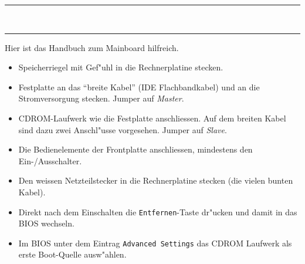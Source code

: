 \documentclass[11pt]{article}
\begin{document}
\hskip 12mm
\rule[-18.8cm]{0.2pt}{5mm}  %
\hskip 12mm
\begin{minipage}[t]{7cm}
\hfill {\Large{}}\\
\hrule
{}

Hier ist das Handbuch zum Mainboard hilfreich.

\begin{itemize}
\item Speicherriegel mit Gef"uhl in die Rechnerplatine stecken.

\item Festplatte an das "`breite Kabel"' (IDE Flachbandkabel) und an die
  Stromversorgung stecken. Jumper auf {\em Master}.

\item CDROM-Laufwerk wie die Festplatte anschliessen. Auf dem breiten
  Kabel sind dazu zwei Anschl"usse vorgesehen. Jumper auf {\em Slave}.

\item Die Bedienelemente der Frontplatte anschliessen, mindestens den
  Ein-/Ausschalter. 

\item Den weissen Netzteilstecker in die Rechnerplatine stecken (die vielen bunten Kabel).

\end{itemize}


\begin{itemize}
  
\item Direkt nach dem Einschalten die {\tt Entfernen}-Taste dr"ucken
  und damit in das BIOS wechseln.

\item Im BIOS unter dem Eintrag {\tt Advanced Settings} das CDROM Laufwerk als 
  erste Boot-Quelle ausw"ahlen.

\end{itemize}

\end{minipage}


\newpage %
\end{document}
